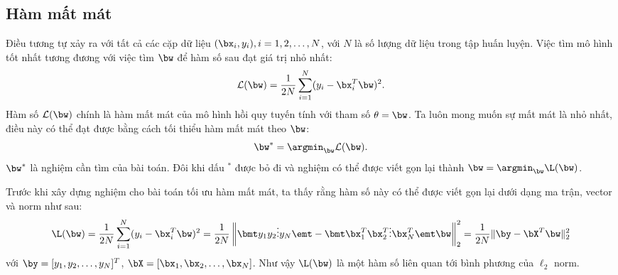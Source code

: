 \subsection{Hàm mất mát}

Điều tương tự xảy ra với tất cả các cặp dữ liệu $(\bx_i, y_i), i = 1, 2, \dots,
N $, với $N$ là số lượng dữ liệu trong tập huấn luyện. Việc tìm mô hình tốt nhất tương đương với việc tìm $\bw$ để hàm số sau
đạt giá trị nhỏ nhất:
\begin{equation}
  \label{eqn:3_2}
  \mathcal{L}(\bw) = \frac{1}{2N}\sum_{i=1}^N (y_i - \bx_i^T\bw)^2.
\end{equation}
Hàm số $\mathcal{L}(\bw)$ chính là hàm mất mát của mô hình hồi quy tuyến tính với tham số $\theta = \bw$. Ta luôn mong muốn sự
mất mát là nhỏ nhất, điều này có thể
đạt được bằng cách tối thiểu hàm mất mát theo $\bw$: 
\begin{equation}
\label{eqn:3_4}
\bw^* = \argmin_{\bw} \mathcal{L}(\bw).
\end{equation}
$\bw^*$ là nghiệm cần tìm của bài toán. Đôi khi dấu $^*$ được bỏ đi và nghiệm có thể được viết gọn lại thành $\displaystyle \bw = \argmin_{\bw}\L(\bw)$.




Trước khi xây dựng nghiệm cho bài toán tối ưu hàm mất mát, ta thấy rằng hàm
số này có thể được viết gọn lại dưới dạng ma trận, vector và norm như sau: 
\begin{equation}
    \L(\bw) = \frac{1}{2N}\sum_{i=1}^N (y_i - \bx_i^T\bw)^2 
    = \frac{1}{2N} \left\|\bmt y_1 \\y_2 \\\vdots \\ y_N  \emt - 
    \bmt \bx_1^T \\ \bx_2^T \\ \vdots \\ \bx_N^T \emt \bw 
    \right\|_2^2 = \frac{1}{2N} \| \by - \bX^T\bw\|_2^2 
\end{equation}
với $\by = [y_1, y_2, \dots, y_N]^T$, $\bX = [\bx_1, \bx_2, \dots, \bx_N]$.
Như vậy $\L(\bw)$ là một hàm số liên quan tới bình phương của $\ell_2$ norm. 







